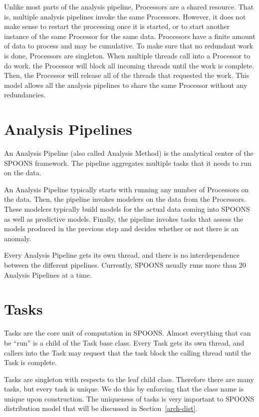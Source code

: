 \documentclass[12pt]{ucthesis}
\begin{document}
Unlike most parts of the analysis pipeline, Processors are a shared resource. That is, multiple analysis pipelines
invoke the same Processors. However, it does not make sense to restart the processing once it is started, or to
start another instance of the same Processor for the same data. Processors have a finite amount of data to process and may be cumulative.
To make sure that no redundant work is done, Processors are singleton. When multiple threads call into a Processor to do work, the Processor will block
all incoming threads until the work is complete. Then, the Processor will release all of the threads that requested the work.
This model allows all the analysis pipelines to share the same Processor without any redundancies.

\section{Analysis Pipelines}
\label{arch-pipelines}
An Analysis Pipeline (also called Analysis Method) is the analytical center of the SPOONS framework.
The pipeline aggregates multiple tasks that it needs to run on the data.

An Analysis Pipeline typically starts with running any number of Processors on the data.
Then, the pipeline invokes modelers on the data from the Processors. These modelers typically build models for the
actual data coming into SPOONS as well as predictive models.
Finally, the pipeline invokes tasks that assess the models produced in the previous
step and decides whether or not there is an anomaly.

Every Analysis Pipeline gets its own thread, and there is no interdependence between the different pipelines.
Currently, SPOONS usually runs more than 20 Analysis Pipelines at a time.

\section{Tasks}
\label{arch-tasks}
Tasks are the core unit of computation in SPOONS. Almost everything that can be ``run'' is a child of the Task base
class. Every Task gets its own thread, and callers into the Task may request that the task block the calling thread
until the Task is complete.

Tasks are singleton with respects to the leaf child class. Therefore there are many tasks, but every task is
unique. We do this by enforcing that the class name is unique upon construction. The uniqueness of tasks is very
important to SPOONS distribution model that will be discussed in Section~\ref{arch-dist}.
\end{document}
